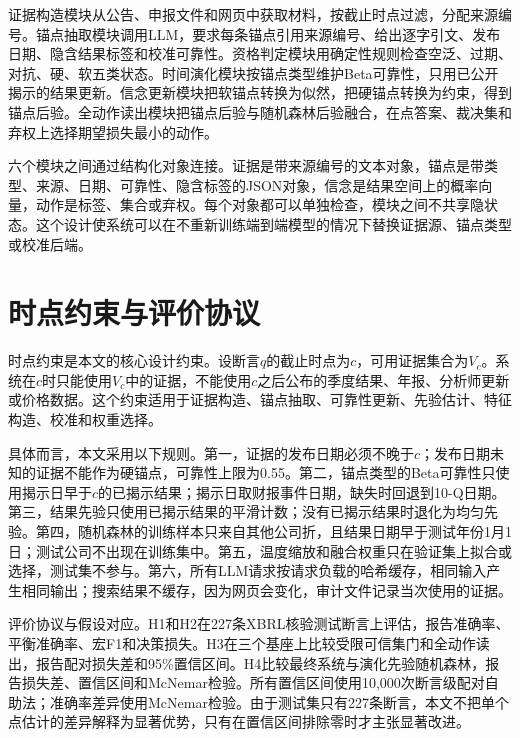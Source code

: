 证据构造模块从公告、申报文件和网页中获取材料，按截止时点过滤，分配来源编号。锚点抽取模块调用LLM，要求每条锚点引用来源编号、给出逐字引文、发布日期、隐含结果标签和校准可靠性。资格判定模块用确定性规则检查空泛、过期、对抗、硬、软五类状态。时间演化模块按锚点类型维护Beta可靠性，只用已公开揭示的结果更新。信念更新模块把软锚点转换为似然，把硬锚点转换为约束，得到锚点后验。全动作读出模块把锚点后验与随机森林后验融合，在点答案、裁决集和弃权上选择期望损失最小的动作。

六个模块之间通过结构化对象连接。证据是带来源编号的文本对象，锚点是带类型、来源、日期、可靠性、隐含标签的JSON对象，信念是结果空间上的概率向量，动作是标签、集合或弃权。每个对象都可以单独检查，模块之间不共享隐状态。这个设计使系统可以在不重新训练端到端模型的情况下替换证据源、锚点类型或校准后端。

\section{时点约束与评价协议}

时点约束是本文的核心设计约束。设断言$q$的截止时点为$c$，可用证据集合为$V_c$。系统在$c$时只能使用$V_c$中的证据，不能使用$c$之后公布的季度结果、年报、分析师更新或价格数据。这个约束适用于证据构造、锚点抽取、可靠性更新、先验估计、特征构造、校准和权重选择。

具体而言，本文采用以下规则。第一，证据的发布日期必须不晚于$c$；发布日期未知的证据不能作为硬锚点，可靠性上限为0.55。第二，锚点类型的Beta可靠性只使用揭示日早于$c$的已揭示结果；揭示日取财报事件日期，缺失时回退到10-Q日期。第三，结果先验只使用已揭示结果的平滑计数；没有已揭示结果时退化为均匀先验。第四，随机森林的训练样本只来自其他公司折，且结果日期早于测试年份1月1日；测试公司不出现在训练集中。第五，温度缩放和融合权重只在验证集上拟合或选择，测试集不参与。第六，所有LLM请求按请求负载的哈希缓存，相同输入产生相同输出；搜索结果不缓存，因为网页会变化，审计文件记录当次使用的证据。

评价协议与假设对应。H1和H2在227条XBRL核验测试断言上评估，报告准确率、平衡准确率、宏F1和决策损失。H3在三个基座上比较受限可信集门和全动作读出，报告配对损失差和95\%置信区间。H4比较最终系统与演化先验随机森林，报告损失差、置信区间和McNemar检验。所有置信区间使用10,000次断言级配对自助法；准确率差异使用McNemar检验。由于测试集只有227条断言，本文不把单个点估计的差异解释为显著优势，只有在置信区间排除零时才主张显著改进。






